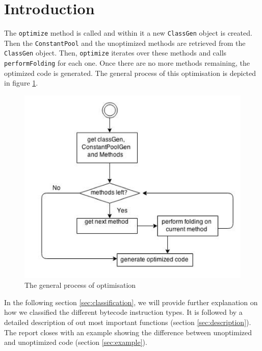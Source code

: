 \section{Introduction}

The \texttt{optimize} method is called and within it a new \texttt{ClassGen} object is created. Then the \texttt{ConstantPool} and the unoptimized methods are retrieved from the \texttt{ClassGen} object. Then, \texttt{optimize} iterates over these methods and calls \texttt{performFolding} for each one. Once there are no more methods remaining, the optimized code is generated. The general process of this optimisation is depicted in figure \ref{fig:overview}.

\begin{figure}[h]
\includegraphics{figures/optimise_overview}
\caption{The general process of optimisation}
\label{fig:overview}
\end{figure}

In the following section \ref{sec:classification}, we will provide further explanation on how we classified the different bytecode instruction types. It is followed by a detailed description of out most important functions (section \ref{sec:description}). The report closes with an example showing the difference between unoptimized and unoptimized code (section \ref{sec:example}).